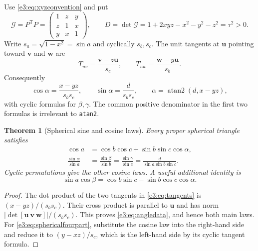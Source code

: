 \documentclass[11pt,letterpaper]{article}
\numberwithin{equation}{section}
\newtheorem{theorem}{Theorem}[section]
\theoremstyle{definition}
\theoremstyle{remark}
\newcommand{\atantwo}{\operatorname{atan2}}
\newcommand{\vv}[1]{\bm{#1}}
\newcommand{\transpose}{^{\mathsf T}}
\begin{document}
Use \cref{e3:eq:xyzconvention} and put
\begin{equation}\label{e3:eq:grammatrix}
 \mathcal G=P\transpose P=
 \begin{pmatrix}1&z&y\\z&1&x\\y&x&1\end{pmatrix},
 \qquad D=\det\mathcal G=1+2xyz-x^2-y^2-z^2=\tau^2>0.
\end{equation}
Write $s_a=\sqrt{1-x^2}=\sin a$ and cyclically $s_b,s_c$.
The unit tangents at $\vv u$ pointing toward $\vv v$ and $\vv w$ are
\begin{equation}\label{e3:eq:tangents}
 T_{uv}=\frac{\vv v-z\vv u}{s_c},\qquad
 T_{uw}=\frac{\vv w-y\vv u}{s_b}.
\end{equation}
Consequently
\begin{equation}\label{e3:eq:angledata}
 \cos\alpha=\frac{x-yz}{s_bs_c},\qquad
 \sin\alpha=\frac{d}{s_bs_c},\qquad
 \alpha=\atantwo(d,x-yz),
\end{equation}
with cyclic formulas for $\beta,\gamma$. The common positive denominator
in the first two formulas is irrelevant to \texttt{atan2}.

\begin{theorem}[Spherical sine and cosine laws]\label{e3:thm:spherical-laws}
Every proper spherical triangle satisfies
\begin{align}
 \cos a&=\cos b\cos c+\sin b\sin c\cos\alpha,\label{e3:eq:sphericalcos}\\
 \frac{\sin\alpha}{\sin a}
 &=\frac{\sin\beta}{\sin b}
  =\frac{\sin\gamma}{\sin c}
  =\frac{d}{\sin a\sin b\sin c}.\label{e3:eq:sphericalsine}
\end{align}
Cyclic permutations give the other cosine laws. A useful additional identity
is
\begin{equation}\label{e3:eq:sphericalfourpart}
 \sin a\cos\beta=
 \cos b\sin c-\sin b\cos c\cos\alpha.
\end{equation}
\end{theorem}
\begin{proof}
The dot product of the two tangents in \cref{e3:eq:tangents} is
$(x-yz)/(s_bs_c)$. Their cross product is parallel to $\vv u$ and has norm
$|\det[\vv u\ \vv v\ \vv w]|/(s_bs_c)$. This proves
\cref{e3:eq:angledata}, and hence both main laws. For
\cref{e3:eq:sphericalfourpart}, substitute the cosine law into the right-hand
side and reduce it to $(y-xz)/s_c$, which is the left-hand side by its cyclic
tangent formula.
\end{proof}
\end{document}

